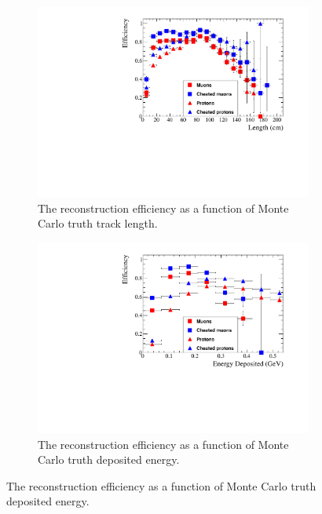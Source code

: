 \begin{figure}[h!]
  \centering
  \begin{subfigure}{.45\textwidth}
        \centering
        \includegraphics[width=\textwidth]{Effic_SingSamps_Length}
        \caption{The reconstruction efficiency as a function of Monte Carlo truth track length.}
        \label{fig:Isol_Effic_Len}
  \end{subfigure}
  \hspace{0.08\textwidth}
  \begin{subfigure}{.45\textwidth}
        \centering
        \includegraphics[width=\textwidth]{Effic_SingSamps_EnDepos}
        \caption{The reconstruction efficiency as a function of Monte Carlo truth deposited energy.}
        \label{fig:Isol_Effic_EnDepos}
  \end{subfigure}

\end{figure}
